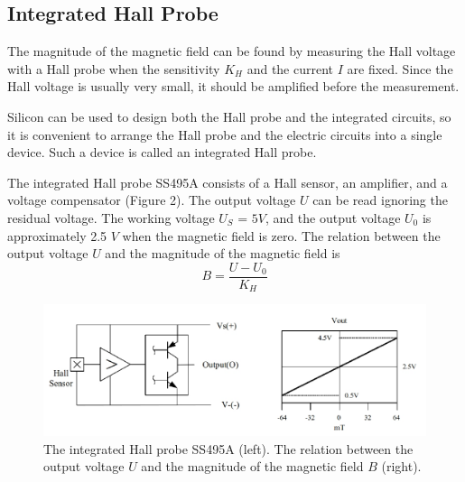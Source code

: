 \documentclass[12pt]{article}
\begin{document}
\subsection{Integrated Hall Probe}
The magnitude of the magnetic field can be found by measuring the Hall voltage with a
Hall probe when the sensitivity $K_H$ and the current $I$ are fixed. Since the Hall voltage is
usually very small, it should be amplified before the measurement.
\par Silicon can be used to design both the Hall probe and the integrated circuits, so it is
convenient to arrange the Hall probe and the electric circuits into a single device. Such a
device is called an integrated Hall probe.
\par The integrated Hall probe SS495A consists of a Hall sensor, an amplifier, and a voltage
compensator (Figure 2). The output voltage $U$ can be read ignoring the residual voltage.
The working voltage $U_S$ = $5V$, and the output voltage $U_0$ is approximately 2.5 $V$ when
the magnetic field is zero. The relation between the output voltage $U$ and the magnitude
of the magnetic field is 
\begin{equation}
B=\frac{U-U_0}{K_H}
\end{equation}
\begin{figure}[H]
\centering
\includegraphics[scale=0.4]{P2.jpg}
\caption{The integrated Hall probe SS495A (left). The relation between the output
voltage $U$ and the magnitude of the magnetic field $B$ (right).}
\end{figure}
\end{document}
